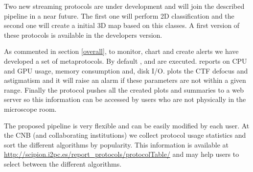 Two new streaming protocols are under development and will join the described  pipeline in a near future. The first one will perform 2D classification and the second one will create a initial 3D map based on this classes. A first version of these protocols is available in the \scipion developers version.

As commented in section \ref{overall}, to monitor, chart and create alerts  we have developed a set of metaprotocols. By default ,  and  are executed.  reports on  CPU and GPU usage, memory consumption and, disk I/O.  plots the CTF defocus and astigmatism  and it will raise an alarm if these parameters are not within a given range. Finally the  protocol pushes all the created plots and summaries to a web server so this information can be accessed by users who are not physically in the microscope room.

The proposed pipeline is very flexible and can be easily modified by each user. At the CNB (and collaborating institutions) we collect protocol usage statistics and sort the different algorithms by popularity.  This information is available at  \url{http://scipion.i2pc.es/report_protocols/protocolTable/} and may help users to select between the different algorithms.


